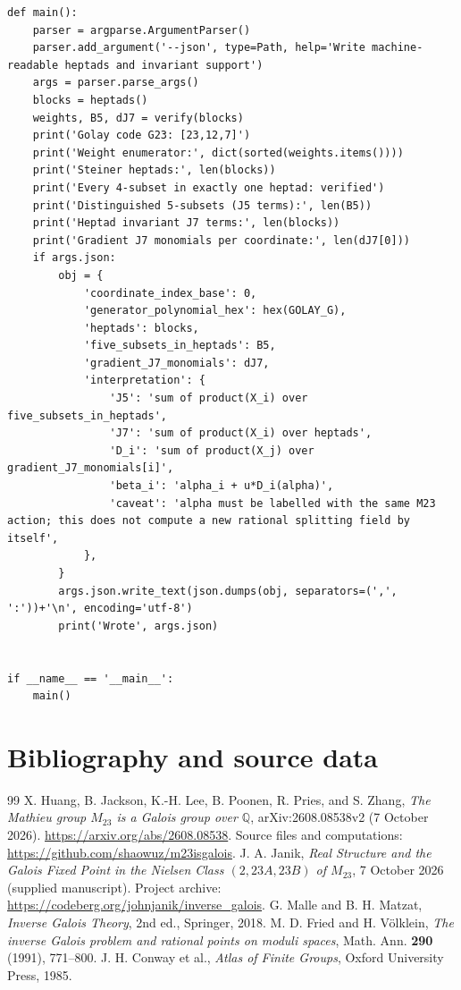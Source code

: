 \documentclass[11pt,letterpaper]{article}
\theoremstyle{definition}
\newcommand{\QQ}{\mathbb{Q}}
\begin{document}
\begin{lstlisting}[style=compactpy]
def main():
    parser = argparse.ArgumentParser()
    parser.add_argument('--json', type=Path, help='Write machine-readable heptads and invariant support')
    args = parser.parse_args()
    blocks = heptads()
    weights, B5, dJ7 = verify(blocks)
    print('Golay code G23: [23,12,7]')
    print('Weight enumerator:', dict(sorted(weights.items())))
    print('Steiner heptads:', len(blocks))
    print('Every 4-subset in exactly one heptad: verified')
    print('Distinguished 5-subsets (J5 terms):', len(B5))
    print('Heptad invariant J7 terms:', len(blocks))
    print('Gradient J7 monomials per coordinate:', len(dJ7[0]))
    if args.json:
        obj = {
            'coordinate_index_base': 0,
            'generator_polynomial_hex': hex(GOLAY_G),
            'heptads': blocks,
            'five_subsets_in_heptads': B5,
            'gradient_J7_monomials': dJ7,
            'interpretation': {
                'J5': 'sum of product(X_i) over five_subsets_in_heptads',
                'J7': 'sum of product(X_i) over heptads',
                'D_i': 'sum of product(X_j) over gradient_J7_monomials[i]',
                'beta_i': 'alpha_i + u*D_i(alpha)',
                'caveat': 'alpha must be labelled with the same M23 action; this does not compute a new rational splitting field by itself',
            },
        }
        args.json.write_text(json.dumps(obj, separators=(',', ':'))+'\n', encoding='utf-8')
        print('Wrote', args.json)


if __name__ == '__main__':
    main()
\end{lstlisting}

\section{Bibliography and source data}
\begin{thebibliography}{99}
 X. Huang, B. Jackson, K.-H. Lee, B. Poonen, R. Pries, and S. Zhang, \emph{The Mathieu group \(M_{23}\) is a Galois group over \(\QQ\)}, arXiv:2608.08538v2 (7 October 2026). \url{https://arxiv.org/abs/2608.08538}. Source files and computations: \url{https://github.com/shaowuz/m23isgalois}.
 J. A. Janik, \emph{Real Structure and the Galois Fixed Point in the Nielsen Class \((2,23A,23B)\) of \(M_{23}\)}, 7 October 2026 (supplied manuscript). Project archive: \url{https://codeberg.org/johnjanik/inverse_galois}.
 G. Malle and B. H. Matzat, \emph{Inverse Galois Theory}, 2nd ed., Springer, 2018.
 M. D. Fried and H. V\"olklein, \emph{The inverse Galois problem and rational points on moduli spaces}, Math. Ann. \textbf{290} (1991), 771--800.
 J. H. Conway et al., \emph{Atlas of Finite Groups}, Oxford University Press, 1985.
\end{thebibliography}
\end{document}
